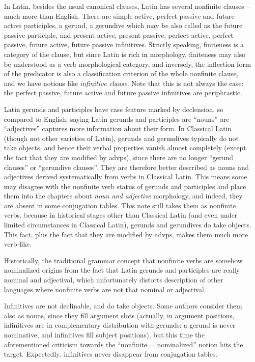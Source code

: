 \documentclass{article}
\newcommand*{\term}[1]{\emph{#1}}
\begin{document}
In Latin, besides the usual canonical clauses, Latin has several nonfinite clauses -- much more than English.
There are simple active, perfect passive and future active participles,
a gerund, a gerundive which may be also called as the future passive participle, and 
present active, present passive, perfect active, perfect passive, future active, future passive infinitives.
Strictly speaking, finiteness is a category of the clause,
but since Latin is rich in morphology, finiteness may also be understood as a verb morphological category,
and inversely, the inflection form of the predicator 
is also a classification criterion of the whole nonfinite clause,
and we have notions like \term{infinitive clause}.
Note that this is not always the case:
the perfect passive, future active and future passive infinitives are periphrastic.

Latin gerunds and participles have case feature marked by declension,
so compared to English, saying Latin gerunds and participles are ``nouns'' are ``adjectives''
captures more information about their form.
In Classical Latin (though not other varieties of Latin), 
gerunds and gerundives typically do not take objects,
and hence their verbal properties vanish almost completely
(except the fact that they are modified by \ac{advp}s),
since there are no longer ``gerund clauses'' or ``gerundive clauses''.
They are therefore better described as nouns and adjectives derived systematically from verbs
in Classical Latin.
This means some may disagree with the nonfinite verb status of gerunds and participles
and place them into the chapters about \emph{noun and adjective} morphology,
and indeed, they are absent in some conjugation tables.
This note still takes them as nonfinite verbs,
because in historical stages other than Classical Latin (and even under limited circumstances in Classical Latin),
gerunds and gerundives do take objects.
This fact, plus the fact that they are modified by \ac{advp}s,
makes them much more verb-like.

Historically, the traditional grammar concept that nonfinite verbs are somehow nominalized origins from the fact 
that Latin gerunds and participles are really nominal and adjectival,
which unfortunately distorts description of other languages 
where nonfinite verbs are not that nominal or adjectival.

Infinitives are not declinable, and do take objects.
Some authors consider them also as nouns, since they fill argument slots
(actually, in argument positions, 
infinitives are in complementary distribution with gerunds:
a gerund is never nominative, and infinitives fill subject positions), 
but this time the aforementioned criticism towards the ``nonfinite = nominalized'' notion hits the target.
Expectedly, infinitives never disappear from conjugation tables. 
\end{document}
